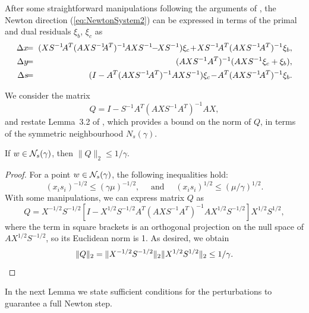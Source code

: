 After some straightforward manipulations following the arguments of 
\cite{GondzioGrothey03}, the Newton
direction (\ref{eq:NewtonSystem2}) can be expressed in terms 
of the primal and dual residuals $\xi_b$, $\xi_c$ as
%
\begin{eqnarray}  \label{eq:Directions}
  \Delta x & \hspace{-1ex} = \hspace{-1ex} & 
  (XS^{-1} \! A^T (AXS^{-1} \!\! A^T)^{-1} \! AXS^{-1} \!\!-\!\! XS^{-1} )\xi_c
  \! + \! XS^{-1} \! A^T (AXS^{-1} \! A^T)^{-1} \xi_b, \nonumber \\
  \Delta y & \hspace{-1ex} = \hspace{-1ex} & 
  (AXS^{-1} A^T)^{-1} (AXS^{-1} \xi_c + \xi_b),                  \\
  \Delta s & \hspace{-1ex} = \hspace{-1ex} & 
  (I - A^T (AXS^{-1} \! A^T)^{-1} AXS^{-1} )\xi_c 
  \! - \! A^T (AXS^{-1} \! A^T)^{-1} \xi_b.            \nonumber
\end{eqnarray}

We consider the matrix
\[
  Q = I - S^{-1} A^T (A X S^{-1} A^T)^{-1} A X,
\]
and restate Lemma~3.2 of \cite{GondzioGrothey03},
which provides a bound on the norm of $Q$, in terms of
the symmetric neighbourhood $N_s(\gamma)$.

\begin{lemma}  \label{th:BoundQ}
If $w \in \mathcal{N}_s(\gamma)$, then $\|Q\|_2 \le 1/\gamma$.
\end{lemma}
%
\begin{proof}
For a point $w \in \mathcal{N}_s(\gamma)$, 
the following inequalities hold:
\[
  (x_i s_i)^{-1/2} \le (\gamma\mu)^{-1/2},
  \quad \mbox{ and } \quad
  (x_i s_i)^{1/2} \le (\mu / \gamma)^{1/2}.
\]
With some manipulations, we can express matrix $Q$ as
\[
Q = X^{-1/2}S^{-1/2} \left[ I - X^{1/2}S^{-1/2}A^T(AXS^{-1}A^T)^{-1}AX^{1/2}S^{-1/2} \right] X^{1/2}S^{1/2},
\]
where the term in square brackets is an orthogonal projection on the null
space of $AX^{1/2}S^{-1/2}$, so its Euclidean norm is 1.
As desired, we obtain
\[
  \| Q \|_2 = \| X^{-1/2}S^{-1/2} \|_2 \| X^{1/2}S^{1/2} \|_2 \le 1/\gamma.
  \qedhere
\]
\end{proof}

In the next Lemma we state sufficient conditions for the perturbations
to guarantee a full Newton step.

